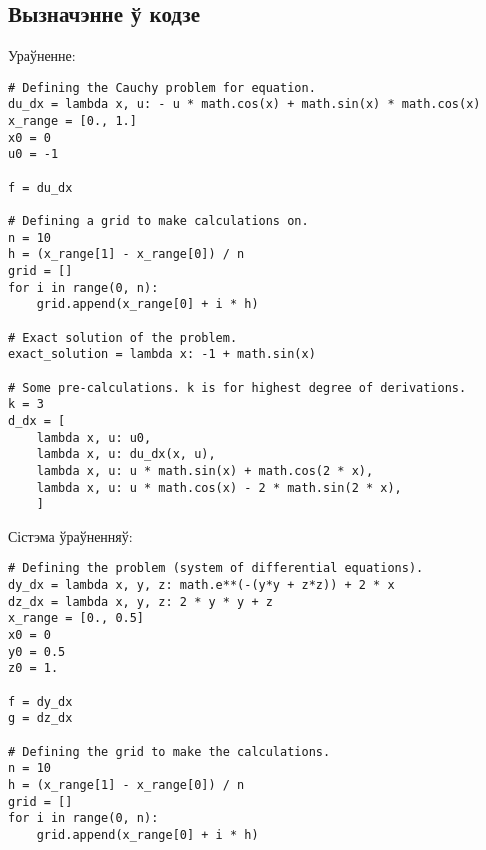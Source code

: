 \subsection*{Вызначэнне ў кодзе}
Ураўненне:
\begin{verbatim}
# Defining the Cauchy problem for equation.
du_dx = lambda x, u: - u * math.cos(x) + math.sin(x) * math.cos(x)
x_range = [0., 1.]
x0 = 0
u0 = -1

f = du_dx

# Defining a grid to make calculations on.
n = 10
h = (x_range[1] - x_range[0]) / n
grid = []
for i in range(0, n):
    grid.append(x_range[0] + i * h)

# Exact solution of the problem.
exact_solution = lambda x: -1 + math.sin(x)

# Some pre-calculations. k is for highest degree of derivations.
k = 3
d_dx = [
    lambda x, u: u0,
    lambda x, u: du_dx(x, u),
    lambda x, u: u * math.sin(x) + math.cos(2 * x),
    lambda x, u: u * math.cos(x) - 2 * math.sin(2 * x),
    ]
\end{verbatim}

Сістэма ўраўненняў:
\begin{verbatim}
# Defining the problem (system of differential equations).
dy_dx = lambda x, y, z: math.e**(-(y*y + z*z)) + 2 * x
dz_dx = lambda x, y, z: 2 * y * y + z
x_range = [0., 0.5]
x0 = 0
y0 = 0.5
z0 = 1.

f = dy_dx
g = dz_dx

# Defining the grid to make the calculations.
n = 10
h = (x_range[1] - x_range[0]) / n
grid = []
for i in range(0, n):
    grid.append(x_range[0] + i * h)
\end{verbatim}
